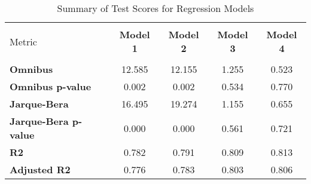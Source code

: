 
    \begin{table}
        \centering
        \caption{Summary of Test Scores for Regression Models}
        \vspace{10pt}
        \label{tab:test_scores}
        \begin{tabular}{lcccc}
        \hline
        \hline \\[-1.8ex]
    Metric & \textbf{Model 1} & \textbf{Model 2} & \textbf{Model 3} & \textbf{Model 4} \\
\hline \\[-1.8ex] 
\textbf{Omnibus} & 12.585 & 12.155 & 1.255 & 0.523 \\
\textbf{Omnibus p-value} & 0.002 & 0.002 & 0.534 & 0.770 \\
\textbf{Jarque-Bera} & 16.495 & 19.274 & 1.155 & 0.655 \\
\textbf{Jarque-Bera p-value} & 0.000 & 0.000 & 0.561 & 0.721 \\
\textbf{R2} & 0.782 & 0.791 & 0.809 & 0.813 \\
\textbf{Adjusted R2} & 0.776 & 0.783 & 0.803 & 0.806 \\

        \hline
        \hline
        \end{tabular}
    \end{table}
    